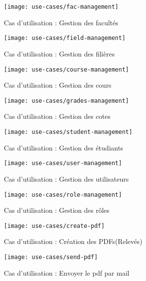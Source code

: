 \begin{figure}[ht]
    \caption{Cas d'utilisation : Gestion des facultés}
    \texttt{[image: use-cases/fac-management]}
    \centering
    \label{fig:fac-management}
\end{figure}
\pagebreak

\begin{figure}[ht]
    \caption{Cas d'utilisation : Gestion des filières}
    \texttt{[image: use-cases/field-management]}
    \centering
    \label{fig:field-management}
\end{figure}
\pagebreak

\begin{figure}[ht]
    \caption{Cas d'utilisation : Gestion des cours}
    \texttt{[image: use-cases/course-management]}
    \centering
    \label{fig:course-management}
\end{figure}
\pagebreak

\begin{figure}[ht]
    \caption{Cas d'utilisation : Gestion des cotes}
    \texttt{[image: use-cases/grades-management]}
    \centering
    \label{fig:grades-management}
\end{figure}
\pagebreak

\begin{figure}[ht]
    \caption{Cas d'utilisation : Gestion des étudiants}
    \texttt{[image: use-cases/student-management]}
    \centering
    \label{fig:student-management}
\end{figure}
\pagebreak

\begin{figure}[ht]
    \caption{Cas d'utilisation : Gestion des utilisateurs}
    \texttt{[image: use-cases/user-management]}
    \centering
    \label{fig:user-management}
\end{figure}
\pagebreak

\begin{figure}[ht]
    \caption{Cas d'utilisation : Gestion des rôles}
    \texttt{[image: use-cases/role-management]}
    \centering
    \label{fig:role-management}
\end{figure}
\pagebreak

\begin{figure}[ht]
    \caption{Cas d'utilisation : Création des PDFs(Relevés)}
    \texttt{[image: use-cases/create-pdf]}
    \centering
    \label{fig:create-pdf}
\end{figure}
\pagebreak

\begin{figure}[ht]
    \caption{Cas d'utilisation : Envoyer le pdf par mail}
    \texttt{[image: use-cases/send-pdf]}
    \centering
    \label{fig:send-pdf}
\end{figure}
\pagebreak



